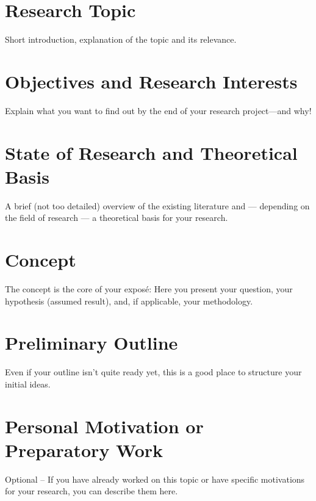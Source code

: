 \documentclass[12pt,oneside]{article}
\begin{document}

\clearpage
{}  
    \setcounter{page}{1}
\lhead{\nouppercase{\leftmark}}


\section{Research Topic} \label{researchtopic}
Short introduction, explanation of the topic and its relevance. 

\section{Objectives and Research Interests} \label{objectives}
Explain what you want to find out by the end of your research project—and why!

\section{State of Research and Theoretical Basis} \label{stateresearch}
A brief (not too detailed) overview of the existing literature and — depending on the field of research — a theoretical basis for your research.

\section{Concept} \label{concept}
The concept is the core of your exposé: Here you present your question, your hypothesis (assumed result), and, if applicable, your methodology.

\section{Preliminary Outline}
Even if your outline isn't quite ready yet, this is a good place to structure your initial ideas.

\section{Personal Motivation or Preparatory Work} \label{motivation}
Optional – If you have already worked on this topic or have specific motivations for your research, you can describe them here.

\clearpage
\lhead{}
\printbibliography
{}




\end{document}
